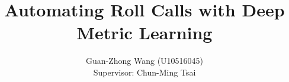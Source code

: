 \documentclass[14pt]{report}
\title{Automating Roll Calls with Deep Metric Learning}
\author{Guan-Zhong Wang (U10516045)\\[1cm]{Supervisor: Chun-Ming Tsai}}
\begin{document}
\maketitle
\date

\tableofcontents
\newpage







\end{document}
